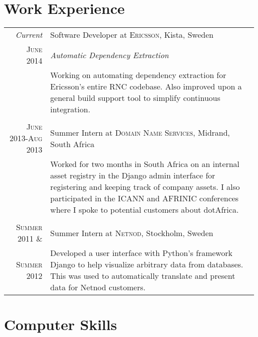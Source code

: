 \documentclass[a4paper,10pt]{article} %
\begin{document}
\section{Work Experience}

\begin{tabular}{r|p{11cm}}
\emph{Current} & Software Developer at \textsc{Ericsson}, Kista, Sweden \\
\textsc{June 2014} & \emph{Automatic Dependency Extraction}\\ 
& \footnotesize{Working on automating dependency extraction for Ericsson’s entire RNC codebase. Also improved upon a general build support tool to simplify continuous integration.}\\
\multicolumn{2}{c}{} \\


\textsc{June 2013-Aug 2013} & Summer Intern at \textsc{Domain Name Services}, Midrand, South Africa \emph{}\\
& \footnotesize{Worked for two months in South Africa on an internal asset registry in the Django admin interface for registering and keeping track of company assets. I also participated in the ICANN and AFRINIC conferences where I spoke to potential customers about dotAfrica.}\\
\multicolumn{2}{c}{} \\


\textsc{Summer 2011 \&} & Summer Intern at \textsc{Netnod}, Stockholm, Sweden \emph{}\\
 \textsc{Summer 2012} & \footnotesize{Developed a user interface with Python’s framework Django to help visualize arbitrary data from databases. This was used to automatically translate and present data for Netnod customers.}
\end{tabular}




\section{Computer Skills}
\end{document}

